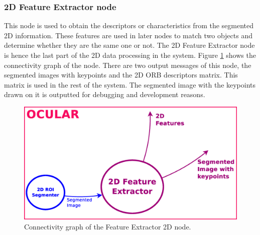 \subsubsection{2D Feature Extractor node}
\label{fe2d}
	This node is used to obtain the descriptors or characteristics from the segmented 2D information. 
	These features are used in later nodes to match two objects and determine whether they are the same one or not. 
	The 2D Feature Extractor node is hence the last part of the 2D data processing in the system. 
	Figure \ref{node_fe2d} shows the connectivity graph of the node. 
	There are two output messages of this node, the segmented images with keypoints and the 2D ORB descriptors matrix. 
	This matrix is used in the rest of the system. 
	The segmented image with the keypoints drawn on it is outputted for debugging and development reasons. 

	\vspace{0.5cm}
	\begin{figure}[H]
			\begin{center}
			\includegraphics[width=0.5\linewidth]{img/diagrams/node_fe2d.eps}
			\caption[Feature Extractor 2D node I/O]{Connectivity graph of the Feature Extractor 2D node.}		
			\label{node_fe2d}
			\end{center}
		\end{figure}
	\vspace{0.5cm}

